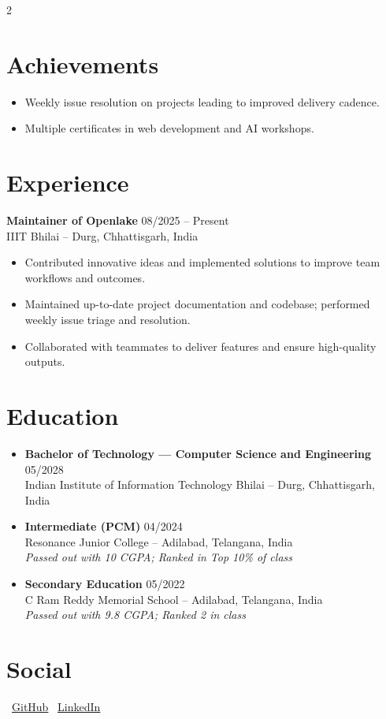 \documentclass[a4paper,11pt]{article}
\begin{document}
\begin{paracol}{2}
	\section*{Achievements}
	\begin{itemize}
		\item Weekly issue resolution on projects leading to improved delivery cadence.
		\item Multiple certificates in web development and AI workshops.
	\end{itemize}
		
		\switchcolumn
		\section*{Experience}
		\textbf{Maintainer of Openlake} \hfill 08/2025 -- Present\\
		IIIT Bhilai – Durg, Chhattisgarh, India
		\begin{itemize}
			\item Contributed innovative ideas and implemented solutions to improve team workflows and outcomes.
			\item Maintained up-to-date project documentation and codebase; performed weekly issue triage and resolution.
			\item Collaborated with teammates to deliver features and ensure high-quality outputs.
		\end{itemize}
		\section*{Education}
		\begin{itemize}
			\item \textbf{Bachelor of Technology — Computer Science and Engineering} \hfill 05/2028\\
			Indian Institute of Information Technology Bhilai – Durg, Chhattisgarh, India
			\item \textbf{Intermediate (PCM)} \hfill 04/2024\\
			Resonance Junior College – Adilabad, Telangana, India\\
			\emph{Passed out with 10 CGPA; Ranked in Top 10\% of class}
			\item \textbf{Secondary Education} \hfill 05/2022\\
			C Ram Reddy Memorial School – Adilabad, Telangana, India\\
			\emph{Passed out with 9.8 CGPA; Ranked 2 in class}
		\end{itemize}
	\section*{Social}
	\faGithub\ \href{https://github.com/BodikeChaithali}{GitHub} \quad
	\faLinkedin\ \href{https://www.linkedin.com/in/chaitali-bodike-6702a427}{LinkedIn}
	\end{paracol}
\end{document}
